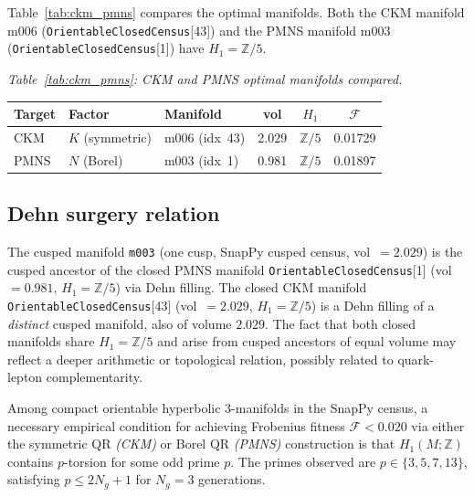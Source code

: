 \documentclass[epjc3]{svjour3}
\begin{document}
Table~\ref{tab:ckm_pmns} compares the optimal manifolds.
Both the CKM manifold m006 (\texttt{OrientableClosedCensus}[43])
and the PMNS manifold m003 (\texttt{OrientableClosedCensus}[1])
have $H_1 = \mathbb{Z}/5$.


\begin{center}
\textit{Table~\ref{tab:ckm_pmns}: CKM and PMNS optimal manifolds compared.}\label{tab:ckm_pmns}\\
\smallskip
\begin{tabular}{lllccc}
\toprule
Target & Factor & Manifold & vol & $H_1$ & $\mathcal{F}$ \\
\midrule
CKM  & $K$ (symmetric) & m006 (idx~43) & 2.029 & $\mathbb{Z}/5$ & 0.01729 \\
PMNS & $N$ (Borel)     & m003 (idx~1)  & 0.981 & $\mathbb{Z}/5$ & 0.01897 \\
\bottomrule
\end{tabular}
\end{center}


\subsection{Dehn surgery relation}

The cusped manifold \texttt{m003} (one cusp, SnapPy cusped census,
vol~$= 2.029$) is the cusped ancestor of the closed PMNS manifold
\texttt{OrientableClosedCensus}[1] (vol~$= 0.981$, $H_1 = \mathbb{Z}/5$)
via Dehn filling.
The closed CKM manifold \texttt{OrientableClosedCensus}[43]
(vol~$= 2.029$, $H_1 = \mathbb{Z}/5$) is a Dehn filling of a
\emph{distinct} cusped manifold, also of volume $2.029$.
The fact that both closed manifolds share $H_1 = \mathbb{Z}/5$ and
arise from cusped ancestors of equal volume may reflect a deeper
arithmetic or topological relation, possibly related to
quark-lepton complementarity.

\begin{proposition}
\label{prop:oddtorsion}
Among compact orientable hyperbolic 3-manifolds in the SnapPy census,
a necessary empirical condition for achieving Frobenius fitness
$\mathcal{F} < 0.020$ via either the symmetric QR \emph{(CKM)} or
Borel QR \emph{(PMNS)} construction is that $H_1(M;\mathbb{Z})$
contains $p$-torsion for some odd prime $p$.
The primes observed are $p \in \{3, 5, 7, 13\}$, satisfying
$p \leq 2N_g + 1$ for $N_g = 3$ generations.
\end{proposition}

\end{document}
